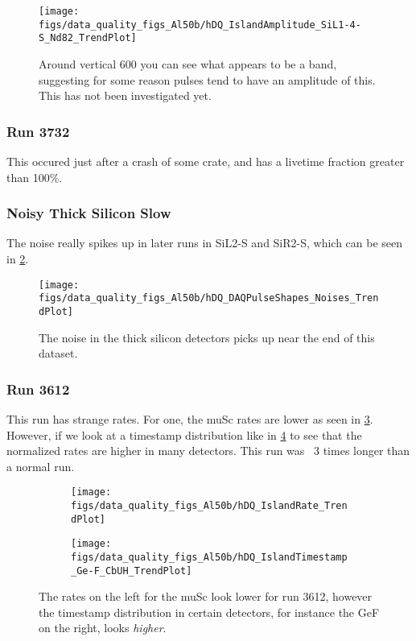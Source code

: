 \documentclass[a4paper]{article}
\begin{document}
\begin{figure}
  \centering
  \texttt{[image: figs/data\_quality\_figs\_Al50b/hDQ\_IslandAmplitude\_SiL1-4-S\_Nd82\_TrendPlot]}
  \caption{Around vertical 600 you can see what appears to be a band,
    suggesting for some reason pulses tend to have an amplitude of this.
    This has not been investigated yet.}
  \label{fig:sil14s_amp}
\end{figure}


\subsubsection{Run 3732}

This occured just after a crash of some crate, and has a livetime fraction
greater than 100\%.


\subsubsection{Noisy Thick Silicon Slow}

The noise really spikes up in later runs in SiL2-S and SiR2-S, which can be seen in \ref{fig:al50b_noise}.

\begin{figure}
  \centering
  \texttt{[image: figs/data\_quality\_figs\_Al50b/hDQ\_DAQPulseShapes\_Noises\_TrendPlot]}
  \caption{The noise in the thick silicon detectors picks up near the end of this dataset.}
  \label{fig:al50b_noise}
\end{figure}


\subsubsection{Run 3612}

This run has strange rates. For one, the muSc rates are lower as seen in \ref{fig:al50b_rates}.
However, if we look at a timestamp distribution like in \ref{fig:al50b_gef_timestamps} to
see that the normalized rates are higher in many detectors. This run was ~3 times longer
than a normal run.

\begin{figure}
  \centering
  \begin{subfigure}{0.5\textwidth}
    \texttt{[image: figs/data\_quality\_figs\_Al50b/hDQ\_IslandRate\_TrendPlot]}
    \caption{}\label{fig:al50b_rates}
  \end{subfigure}%
  \begin{subfigure}{0.5\textwidth}
    \texttt{[image: figs/data\_quality\_figs\_Al50b/hDQ\_IslandTimestamp\_Ge-F\_CbUH\_TrendPlot]}
    \caption{}\label{fig:al50b_gef_timestamps}
  \end{subfigure}
  \caption{The rates on the left for the muSc look lower for run 3612, however the timestamp distribution in certain
    detectors, for instance the GeF on the right, looks \emph{higher}.}
  \label{fig:al50b_3612}
\end{figure}
\end{document}
